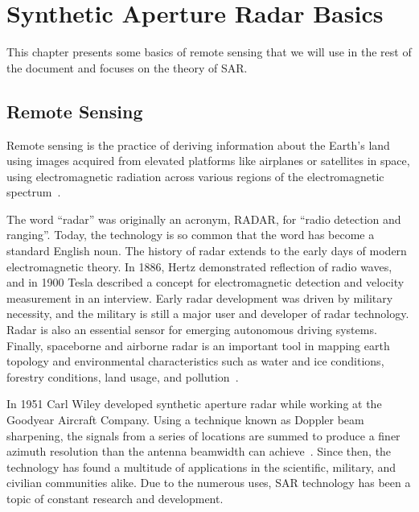 \chapter{Synthetic Aperture Radar Basics}\label{chp:background}%
% 

%	




This chapter presents some basics of remote sensing that we will use in the rest of the document and focuses on the theory of SAR.

\section{Remote Sensing} \label{sec:pr_obs}

Remote sensing is the practice of deriving information about the Earth's land using images acquired from elevated platforms like airplanes or satellites in space, using electromagnetic radiation across various regions of the electromagnetic spectrum~\citep{campbell2011introduction}.

The word “radar” was originally an acronym, RADAR, for “radio detection and ranging”.
Today, the technology is so common that the word has become a standard English noun.
The history of radar extends to the early days of modern electromagnetic theory. 
In 1886, Hertz demonstrated reflection of radio waves, and in 1900 Tesla described a concept for electromagnetic detection and velocity measurement in an interview.
Early radar development was driven by military necessity, and the military is still a major user and developer of radar technology.
Radar is also an essential sensor for emerging autonomous driving systems. 
Finally, spaceborne and airborne radar is an important tool in mapping earth topology and environmental characteristics such as water and ice conditions, forestry conditions, land usage, and pollution~\citep{richards2005fundamentals}.

In 1951 Carl Wiley developed synthetic aperture radar while working at the Goodyear Aircraft Company. 
Using a technique known as Doppler beam sharpening, the signals from a series of locations are summed to produce a finer azimuth resolution than 
the antenna beamwidth can achieve~\citep{wiley1985synthetic}. 
Since then, the technology has found a multitude of applications in the scientific, military, and civilian communities alike. Due to the numerous uses, SAR technology has been a topic of constant
research and development.

